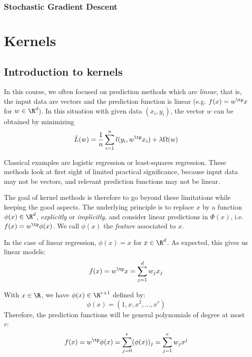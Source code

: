 \documentclass{../cs-classes/cs-classes}
\begin{document}
\subsubsection{Stochastic Gradient Descent}

\section{Kernels}
\subsection{Introduction to kernels}
In this course, we often focused on prediction methods which are \emph{linear}, that is, the input data are vectors and the prediction function is linear (e.g. $f(x)=w^\tp x$ for $w\in\R^d$). In this situation with given data $(x_i, y_i)$, the vector $w$ can be obtained by minimizing
\begin{equation*}
    \hat{L}(w)=\frac{1}{n}\sum_{i=1}^n l(y_i, w^\tp x_i) + \lambda \Omega(w)
\end{equation*}

Classical examples are logistic regression or least-squares regression. These methods look at first sight of limited practical significance, because input data may not be vectors, and relevant prediction functions may not be linear.

The goal of kernel methods is therefore to go beyond these limitations while keeping the good aspects. The underlying principle is to replace $x$ by a function $\phi(x)\in\R^d$, \emph{explicitly} or \emph{implicitly}, and consider linear predictions in $\Phi(x)$, i.e.~$f(x)=w^\tp \phi(x)$. We call $\phi(x)$ the \emph{feature} associated to $x$.

\begin{example}
    In the case of linear regression, $\phi(x)=x$ for $x\in\R^d$. As expected, this gives us linear models:
    \begin{equation*}
        f(x)=w^\tp x = \sum_{j=1}^d w_jx_j
    \end{equation*}
\end{example}

\begin{example}
    With $x\in\R$, we have $\phi(x)\in\R^{r+1}$ defined by:
    \begin{equation*}
        \phi(x)=(1, x, x^2, \dots, x^r)
    \end{equation*}
    Therefore, the prediction functions will be general polynomials of degree at most $r$:
    \begin{equation*}
        f(x)=w^\tp\phi(x)=\sum_{j=0}^r (\phi(x))_j = \sum_{j=1}^r w_jx^j
    \end{equation*}
\end{example}
\end{document}
